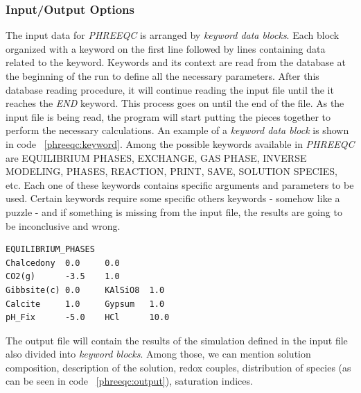 \documentclass[ppgc,mestrado,English]{iiufrgs}
\begin{document}
\subsubsection{Input/Output Options}
The input data for \emph{PHREEQC} is arranged by \emph{keyword data blocks}. Each block organized with a keyword on the first line followed by lines containing data related to the keyword. Keywords and its context are read from the database at the beginning of the run to define all the necessary parameters. After this database reading procedure, it will continue reading the input file until the it reaches the \emph{END} keyword. This process goes on until the end of the file. As the input file is being read, the program will start putting the pieces together to perform the necessary calculations. An example of a \emph{keyword data block} is shown in code ~\ref{phreeqc:keyword}. Among the possible keywords available in \emph{PHREEQC} are EQUILIBRIUM PHASES, EXCHANGE, GAS PHASE, INVERSE MODELING, PHASES, REACTION, PRINT, SAVE, SOLUTION SPECIES, etc. Each one of these keywords contains specific arguments and parameters to be used. Certain keywords require some specific others keywords - somehow like a puzzle - and if something is missing from the input file, the results are going to be inconclusive and wrong.

\begin{minipage}[c]{0.93\textwidth}
\begin{lstlisting}[frame=single, caption=\emph{PHREEQC} keyword data block example, label=phreeqc:keyword]
EQUILIBRIUM_PHASES
Chalcedony  0.0     0.0
CO2(g)      -3.5    1.0
Gibbsite(c) 0.0     KAlSiO8  1.0
Calcite     1.0     Gypsum   1.0
pH_Fix      -5.0    HCl      10.0
\end{lstlisting}
\end{minipage}

The output file will contain the results of the simulation defined in the input file also divided into \emph{keyword blocks}. Among those, we can mention solution composition, description of the solution, redox couples, distribution of species (as can be seen in code ~\ref{phreeqc:output}), saturation indices.
\end{document}

